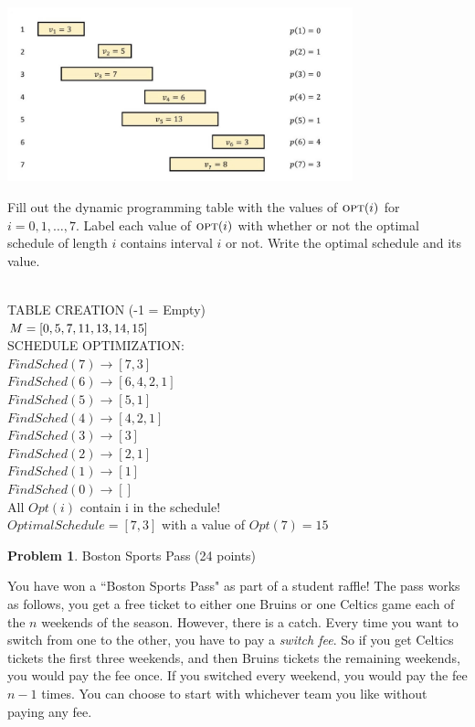 \documentclass[11pt]{article}
\newcommand{\opt}{\textsc{opt}}
\theoremstyle{definition}
\theoremstyle{theorem}
\newtheorem{prob}{Problem}
\newcommand{\solution}{\medskip\noindent{\color{DarkBlue}\textbf{Solution:}}}
\begin{document}
\begin{center}
		\includegraphics[width=0.75\textwidth]{wis.jpg}
\end{center}

Fill out the dynamic programming table with the values of $\opt(i)$ for $i = 0,1,\dots,7$.  Label each value of $\opt(i)$ with whether or not the optimal schedule of length $i$ contains interval $i$ or not.  Write the optimal schedule and its value.

\solution \\ TABLE CREATION (-1 = {Empty}) \\
$\\ M = [0, 5, 7, 11, 13, 14, 15]\\$\\
SCHEDULE OPTIMIZATION:\\
$FindSched(7) \rightarrow [7, 3]$\\
$FindSched(6) \rightarrow [6, 4, 2, 1]$\\
$FindSched(5) \rightarrow [5, 1]$\\
$FindSched(4) \rightarrow [4, 2, 1]$\\
$FindSched(3) \rightarrow [3]$\\
$FindSched(2) \rightarrow [2, 1]$\\
$FindSched(1) \rightarrow [1]$\\
$FindSched(0) \rightarrow []$\\
All $Opt(i)$ contain i in the schedule!\\
$Optimal Schedule = [7, 3]$ with a value of $Opt(7) = 15$\\


\newpage

\begin{prob} Boston Sports Pass (24 points) \end{prob}

You have won a ``Boston Sports Pass" as part of a student raffle! The pass works as follows, you get a free ticket to either one Bruins or one Celtics game each of the $n$ weekends of the season. However, there is a catch. Every time you want to switch from one to the other, you have to pay a \emph{switch fee}. So if you get Celtics tickets the first three weekends, and then Bruins tickets the remaining weekends, you would pay the fee once. If you switched every weekend, you would pay the fee $n-1$ times. You can choose to start with whichever team you like without paying any fee.
\end{document}
